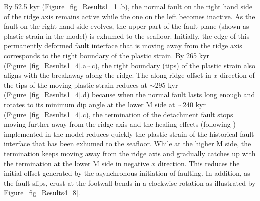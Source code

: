 By 52.5 kyr (Figure~\hyperref[fig_Results1_1]{\ref{fig_Results1_1}.b}), the normal fault on the right hand side of the ridge axis remains active while the one on the left becomes inactive. 
As the fault on the right hand side evolves, the upper part of the fault plane (shown as plastic strain in the model) is exhumed to the seafloor.
Initially, the edge of this permanently deformed fault interface that is moving away from the ridge axis corresponds to the right boundary of the plastic strain. By 265 kyr (Figure~\hyperref[fig_Results1_4]{\ref{fig_Results1_4}.a$\sim$c}), the right boundary (tips) of the plastic strain also aligns with the breakaway along the ridge. The along-ridge offset in $x$-direction of the tips of the moving plastic strain reduces at $\sim$295 kyr (Figure~\hyperref[fig_Results1_4]{\ref{fig_Results1_4}.d}) because when the normal fault lasts long enough and rotates to its minimum dip angle at the lower M side at $\sim$240 kyr (Figure~\hyperref[fig_Results1_4]{\ref{fig_Results1_4}.c}), the termination of the detachment fault stops moving further away from the ridge axis and the healing effects (following \citealp{Tucholke2008}) implemented in the model reduces quickly the plastic strain of the historical fault interface that has been exhumed to the seafloor. While at the higher M side, the termination keeps moving away from the ridge axis and gradually catches up with the termination at the lower M side in negative $x$ direction. This reduces the initial offset generated by the asynchronous initiation of faulting. In addition, as the fault slips, crust at the footwall bends in a clockwise rotation as illustrated by Figure~\hyperref[fig_Results4_8]{\ref{fig_Results4_8}}. %


